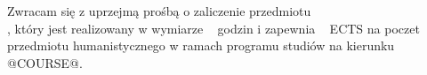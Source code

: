 \documentclass{wmiisubmission}
\begin{document}
\cracowdate
{}
\studentaddress
\addressee{\bakalarski}

\vskip 2.0cm

Zwracam się z uprzejmą prośbą o zaliczenie przedmiotu\\
\fillField{16cm}, który jest realizowany w wymiarze \fillField{3cm}~ godzin
i zapewnia \fillField{1cm}~ ECTS na poczet
przedmiotu humanistycznego w ramach programu studiów na kierunku @COURSE@.

\vskip 2cm
\studentsignature

\vfill


\vskip 1.5cm

\end{document}
